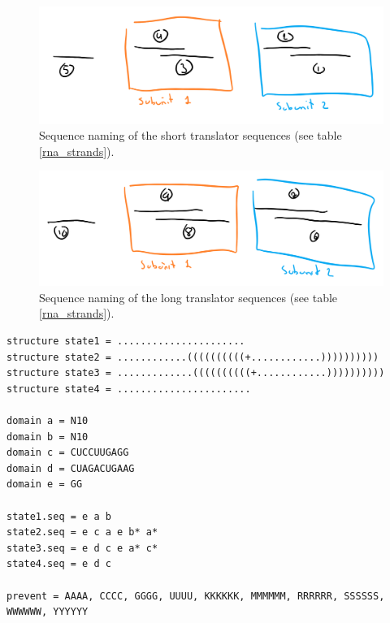 \begin{figure}[H]
\centering
\includegraphics[width=\columnwidth]{images/translator_short_subunits.png}
\caption{Sequence naming of the short translator sequences (see table \ref{rna_strands}).}
\label{translator_short_subunits}
\end{figure}

\begin{figure}[H]
\centering
\includegraphics[width=\columnwidth]{images/translator_long_subunits.png}
\caption{Sequence naming of the long translator sequences (see table \ref{rna_strands}).}
\label{translator_long_subunits}
\end{figure}

\begin{lstlisting}[caption=Nupack code for the short translator, label=codeshort]
structure state1 = ......................
structure state2 = ............((((((((((+............))))))))))
structure state3 = .............((((((((((+............))))))))))
structure state4 = .......................

domain a = N10
domain b = N10
domain c = CUCCUUGAGG
domain d = CUAGACUGAAG
domain e = GG

state1.seq = e a b
state2.seq = e c a e b* a*
state3.seq = e d c e a* c*
state4.seq = e d c

prevent = AAAA, CCCC, GGGG, UUUU, KKKKKK, MMMMMM, RRRRRR, SSSSSS, WWWWWW, YYYYYY
\end{lstlisting}


